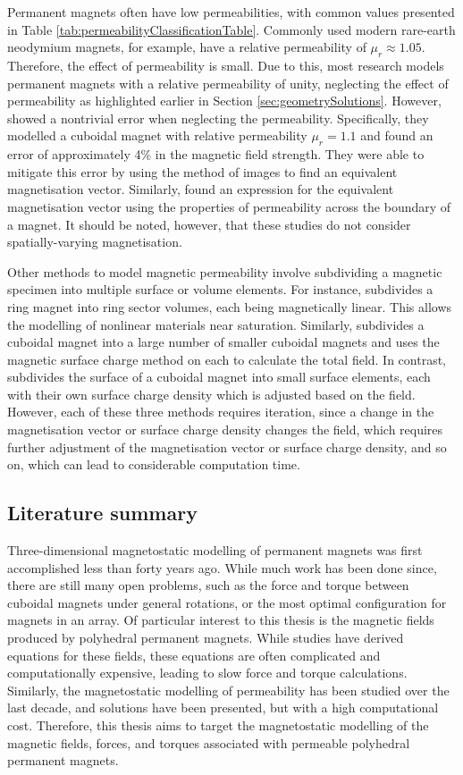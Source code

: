 Permanent magnets often have low permeabilities, with common values presented in Table \ref{tab:permeabilityClassificationTable}. Commonly used modern rare-earth neodymium magnets, for example, have a relative permeability of \(\mu_r \approx 1.05\). Therefore, the effect of permeability is small. Due to this, most research models permanent magnets with a relative permeability of unity, neglecting the effect of permeability as highlighted earlier in Section \ref{sec:geometrySolutions}. However, \textcite{Rovers2013} showed a nontrivial error when neglecting the permeability. Specifically, they modelled a cuboidal magnet with relative permeability \(\mu_r = 1.1\) and found an error of approximately 4\% in the magnetic field strength. They were able to mitigate this error by using the method of images to find an equivalent magnetisation vector. Similarly, \textcite{Kremers2013} found an expression for the equivalent magnetisation vector using the properties of permeability across the boundary of a magnet. It should be noted, however, that these studies do not consider spatially-varying magnetisation.

Other methods to model magnetic permeability involve subdividing a magnetic specimen into multiple surface or volume elements. For instance, \textcite{Forbes2021} subdivides a ring magnet into ring sector volumes, each being magnetically linear. This allows the modelling of nonlinear materials near saturation. Similarly, \textcite{Zhang2021} subdivides a cuboidal magnet into a large number of smaller cuboidal magnets and uses the magnetic surface charge method on each to calculate the total field. In contrast, \textcite{Casteren2014} subdivides the surface of a cuboidal magnet into small surface elements, each with their own surface charge density which is adjusted based on the field. However, each of these three methods requires iteration, since a change in the magnetisation vector or surface charge density changes the field, which requires further adjustment of the magnetisation vector or surface charge density, and so on, which can lead to considerable computation time.

\subsection{Literature summary}
Three-dimensional magnetostatic modelling of permanent magnets was first accomplished less than forty years ago. While much work has been done since, there are still many open problems, such as the force and torque between cuboidal magnets under general rotations, or the most optimal configuration for magnets in an array. Of particular interest to this thesis is the magnetic fields produced by polyhedral permanent magnets. While studies have derived equations for these fields, these equations are often complicated and computationally expensive, leading to slow force and torque calculations. Similarly, the magnetostatic modelling of permeability has been studied over the last decade, and solutions have been presented, but with a high computational cost. Therefore, this thesis aims to target the magnetostatic modelling of the magnetic fields, forces, and torques associated with permeable polyhedral permanent magnets.

